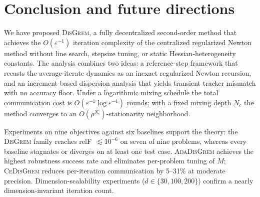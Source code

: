 \documentclass[11pt,a4paper]{article}
\def\cO{O}%
\newcommand{\cO}{\mathcal{O}}
\begin{document}
\section{Conclusion and future directions}\label{sec:conclusion}

	We have proposed \textsc{DisGrem}, a fully decentralized
	second-order method that achieves the
	$\cO(\varepsilon^{-1})$ iteration complexity of the centralized
	regularized Newton method without line search, stepsize tuning,
	or static Hessian-heterogeneity constants.
	The analysis combines two ideas: a reference-step framework
	that recasts the average-iterate dynamics as an inexact regularized
	Newton recursion, and an increment-based dispersion analysis that
	yields transient tracker mismatch with no accuracy floor.
	Under a logarithmic mixing schedule the total communication cost
	is $\cO(\varepsilon^{-1}\log\varepsilon^{-1})$ rounds; with a
	fixed mixing depth $N_c$ the method converges to an
	$\cO(\rho^{N_c})$-stationarity neighborhood.

	Experiments on nine objectives against six baselines support
	the theory: the \textsc{DisGrem} family reaches
	relF~$\lesssim 10^{-6}$ on seven of nine problems, whereas every
	baseline stagnates or diverges on at least one test case.
	\textsc{AdaDisGrem} achieves the highest robustness success rate
	and eliminates per-problem tuning of $M$;
	\textsc{CeDisGrem} reduces per-iteration communication by
	5--31\% at moderate precision.
	Dimension-scalability experiments ($d\in\{30,100,200\}$) confirm
	a nearly dimension-invariant iteration count.
\end{document}
